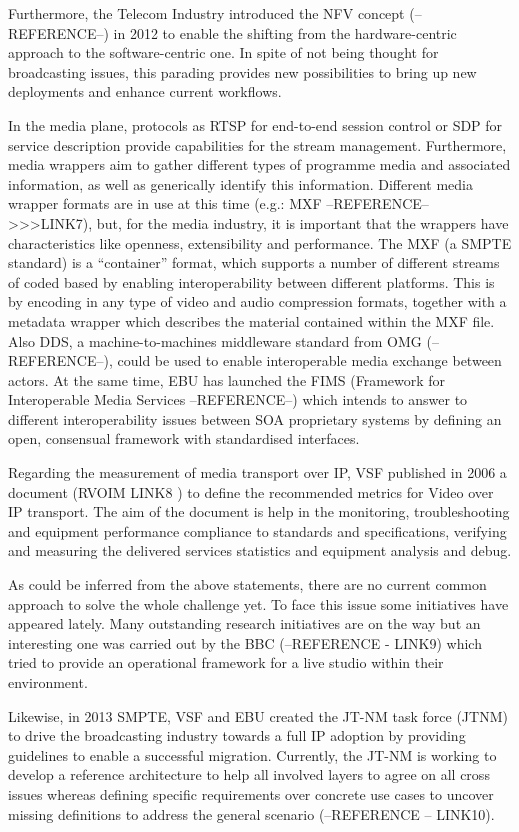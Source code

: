 Furthermore, the Telecom Industry introduced the NFV concept (--REFERENCE--) in 2012 to enable the shifting from the hardware-centric approach to the software-centric one. In spite of not being thought for
broadcasting issues, this parading provides new possibilities to bring up new deployments and  enhance current workflows.

In the media plane, protocols as RTSP for end-to-end session control or SDP for service description provide capabilities for the stream management. Furthermore, media wrappers aim to gather different types of programme media and associated information, as well as generically identify this information. Different media wrapper formats are in use at this time (e.g.: MXF --REFERENCE-->>>LINK7), but, for the media industry, it is important that the wrappers have characteristics like openness, extensibility and performance. The MXF (a SMPTE standard) is a “container” format, which supports a number of different streams of coded based by enabling interoperability between different platforms. This is by encoding in any type of video and audio compression formats, together with a metadata wrapper which describes the material contained within the MXF file. Also DDS, a machine-to-machines middleware standard from OMG (--REFERENCE--), could be used to enable interoperable media exchange between actors. At the same time, EBU has launched the FIMS (Framework for Interoperable Media Services --REFERENCE--) which intends to answer to different interoperability issues between SOA proprietary systems by defining an open, consensual framework with standardised interfaces.

Regarding the measurement of media transport over IP, VSF published in 2006 a document (RVOIM LINK8 ) to define the recommended metrics for Video over IP transport. The aim of the document is help in the monitoring, troubleshooting and equipment performance compliance to standards and specifications, verifying and measuring the delivered services statistics and equipment analysis and debug.

As could be inferred from the above statements, there are no current common approach to solve the whole challenge yet. To face this issue some initiatives have appeared lately. Many outstanding research initiatives are on the way but an interesting one was carried out by the BBC (--REFERENCE - LINK9) which tried to provide an operational framework for a live studio within their environment.

Likewise, in 2013 SMPTE, VSF and EBU created the JT-NM task force (JTNM) to drive the broadcasting industry towards a full IP adoption by providing guidelines to enable a successful migration. Currently, the JT-NM is working to develop a reference architecture to help all involved layers to agree on all cross issues whereas defining specific requirements over concrete use cases to uncover missing definitions to address the general scenario (--REFERENCE -- LINK10).

